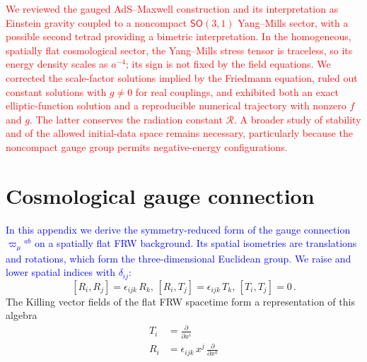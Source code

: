 \documentclass [prd,reprint,eqsecnum,nofootinbib]  {revtex4-1}
\newcommand{\lang}[1]{\textcolor{blue}{#1}}
\newcommand{\science}[1]{\textcolor{red}{#1}}
\begin{document}
\science{We reviewed the gauged AdS--Maxwell construction and its
interpretation as Einstein gravity coupled to a noncompact
$\mathsf{SO}(3,1)$ Yang--Mills sector, with a possible second tetrad
providing a bimetric interpretation. In the homogeneous, spatially
flat cosmological sector, the Yang--Mills stress tensor is traceless,
so its energy density scales as $a^{-4}$; its sign is not fixed by
the field equations. We corrected the scale-factor solutions implied
by the Friedmann equation, ruled out constant solutions with
$g\ne0$ for real couplings, and exhibited both an
exact elliptic-function solution and a reproducible numerical
trajectory with nonzero $f$ and $g$. The latter conserves the
radiation constant $\mathcal R$. A broader study of stability and of
the allowed initial-data space remains necessary, particularly
because the noncompact gauge group permits negative-energy
configurations.}






\appendix*
\section{Cosmological gauge connection}

\lang{In this appendix we derive the symmetry-reduced form of the
gauge connection $\varpi_\mu{}^{ab}$ on a spatially flat FRW
background. Its spatial isometries are translations and rotations,
which form the three-dimensional Euclidean group. We raise and lower
spatial indices with $\delta_{ij}$:}
\begin{equation}\label{a1}
    [R_i, R_j] = \epsilon_{ijk}\, R_k, \, [R_i, T_j] = \epsilon_{ijk}\, T_k, \, [T_i, T_j]
    =0\, .
\end{equation}
The Killing vector fields of the flat FRW spacetime form a
representation of this algebra
\begin{align}
T_i &= \frac{\partial}{\partial x^i}\nonumber \\ R_i
&=\epsilon_{ijk}\, x^j \,\frac{\partial}{\partial x^k}\label{a2}
\end{align}
\end{document}
